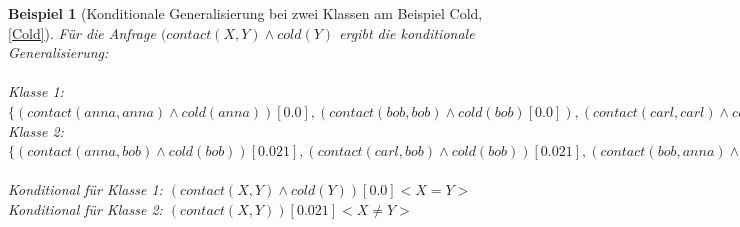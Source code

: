 \documentclass[a4paper, 11pt]{book}
\newtheorem{Bsp}{Beispiel}[section]
\begin{document}
{\begin{itemize}
\begin{itemize}
		\begin{Bsp}[Konditionale Generalisierung bei zwei Klassen am Beispiel Cold, \ref{Cold}]
			Für die Anfrage $ (contact(X,Y) \land cold(Y) $ ergibt die konditionale Generalisierung:\\
			\\
		Klasse 1: $ \{ (contact(anna,anna) \land cold(anna))[0.0], (contact(bob,bob) \land cold(bob)[0.0]), (contact(carl,carl)\land cold(carl))[0.0]\} $\\
		Klasse 2: $ \{(contact(anna,bob) \land cold(bob))[0.021] , (contact(carl, bob) \land cold(bob))[0.021] , (contact(bob, anna) \land cold(anna))[0.021], (contact(anna, carl)\land cold(carl)) [0.021], (contact(bob, carl)\land cold(carl)) [0.021], (contact(carl, anna) \land cold(anna))[0.021] \} $\\
		\\
		Konditional für Klasse 1: $ (contact(X,Y) \land cold(Y))[0.0] <X = Y> $\\
		Konditional für Klasse 2: $ (contact(X,Y))[0.021] <X \neq Y> $\\
		\end{Bsp}
	\end{itemize}
\end{itemize}
}
\end{document}
